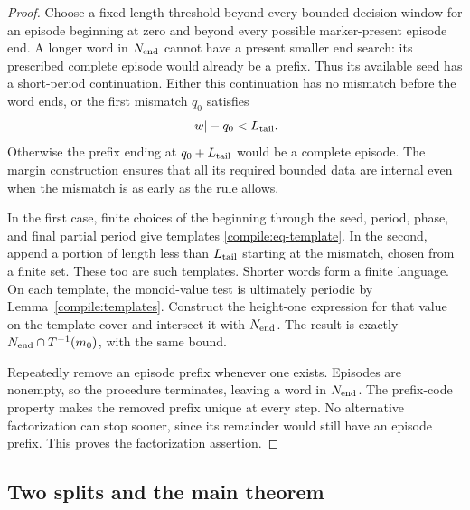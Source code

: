 \begin{proof}
Choose a fixed length threshold beyond every bounded decision window for
an episode beginning at zero and beyond every possible marker-present
episode end. A longer word in $N_{\rm end}$ cannot have a present smaller
end search: its prescribed complete episode would already be a prefix.
Thus its available seed has a short-period continuation. Either this
continuation has no mismatch before the word ends, or the first mismatch
$q_0$ satisfies
\[
                       |w|-q_0<L_{\rm tail}.
\]
Otherwise the prefix ending at $q_0+L_{\rm tail}$ would be a complete
episode. The margin construction ensures that all its required bounded
data are internal even when the mismatch is as early as the rule allows.

In the first case, finite choices of the beginning through the seed,
period, phase, and final partial period give templates
\eqref{compile:eq-template}. In the second, append a portion of length
less than $L_{\rm tail}$ starting at the mismatch, chosen from a finite
set. These too are such templates. Shorter words form a finite language.
On each template, the monoid-value test is ultimately periodic by
Lemma~\ref{compile:templates}. Construct the height-one expression for
that value on the template cover and intersect it with $N_{\rm end}$.
The result is exactly $N_{\rm end}\cap T^{-1}(m_0)$, with the same bound.

Repeatedly remove an episode prefix whenever one exists. Episodes are
nonempty, so the procedure terminates, leaving a word in $N_{\rm end}$.
The prefix-code property makes the removed prefix unique at every step.
No alternative factorization can stop sooner, since its remainder would
still have an episode prefix. This proves the factorization assertion.
\end{proof}

\subsection{Two splits and the main theorem}

